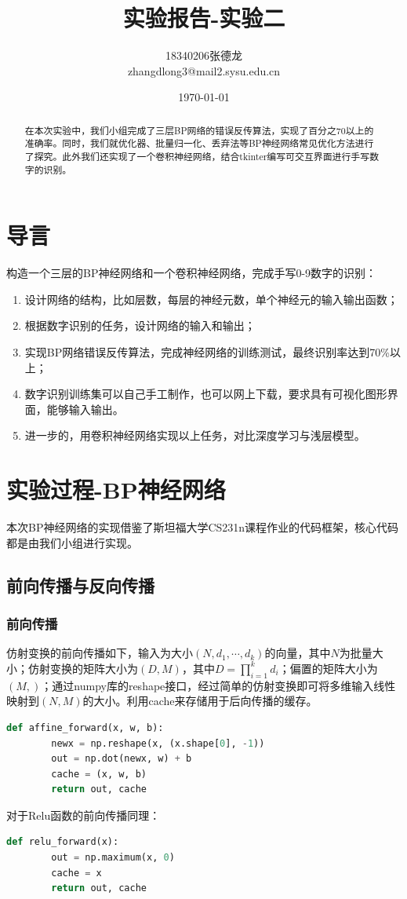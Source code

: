 \documentclass[withoutpreface,bwprint]{cumcmthesis} %
\title{实验报告-实验二}
\author{18340206张德龙 \\
	zhangdlong3@mail2.sysu.edu.cn
}
\date{\today}
\begin{document}
\maketitle
\begin{abstract}
 
 在本次实验中，我们小组完成了三层BP网络的错误反传算法，实现了百分之70以上的准确率。同时，我们就优化器、批量归一化、丢弃法等BP神经网络常见优化方法进行了探究。此外我们还实现了一个卷积神经网络，结合tkinter编写可交互界面进行手写数字的识别。
\end{abstract}

\section{导言}

构造一个三层的BP神经网络和一个卷积神经网络，完成手写0-9数字的识别：
\begin{enumerate}
\item 设计网络的结构，比如层数，每层的神经元数，单个神经元的输入输出函数；
\item 根据数字识别的任务，设计网络的输入和输出；
\item 实现BP网络错误反传算法，完成神经网络的训练测试，最终识别率达到70\%以上；
\item 数字识别训练集可以自己手工制作，也可以网上下载，要求具有可视化图形界面，能够输入输出。
\item 进一步的，用卷积神经网络实现以上任务，对比深度学习与浅层模型。
\end{enumerate}


\section{实验过程-BP神经网络}
本次BP神经网络的实现借鉴了斯坦福大学CS231n课程作业的代码框架，核心代码都是由我们小组进行实现。
\subsection{前向传播与反向传播}
\subsubsection{前向传播}
仿射变换的前向传播如下，输入为大小$(N, d_1, \cdots, d_k)$的向量，其中$N$为批量大小；仿射变换的矩阵大小为$(D, M)$，其中$D = \prod_{i=1}^{k} d_i$；偏置的矩阵大小为$(M,)$；通过numpy库的reshape接口，经过简单的仿射变换即可将多维输入线性映射到$(N, M)$的大小。利用cache来存储用于后向传播的缓存。
\begin{lstlisting}[language=python]
	def affine_forward(x, w, b):
	    newx = np.reshape(x, (x.shape[0], -1))
	    out = np.dot(newx, w) + b
	    cache = (x, w, b)
	    return out, cache
\end{lstlisting}
对于Relu函数的前向传播同理：
\begin{lstlisting}[language=python]
	def relu_forward(x):
	    out = np.maximum(x, 0)
	    cache = x
	    return out, cache
\end{lstlisting}
\end{document}

